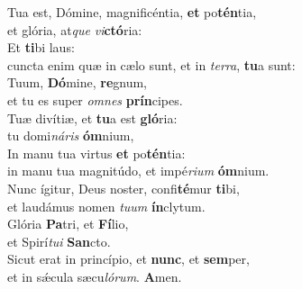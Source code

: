 \evenverse Tua est, Dómine, magnificéntia, \textbf{et} po\textbf{tén}tia,~\*\\
\evenverse et glória, at\textit{que} \textit{vi}\textbf{ctó}ria:\\
\oddverse Et \textbf{ti}bi laus:~\*\\
\oddverse cuncta enim quæ in cælo sunt, et in \textit{ter}\textit{ra}, \textbf{tu}a sunt:\\
\evenverse Tuum, \textbf{Dó}mine, \textbf{re}gnum,~\*\\
\evenverse et tu es super \textit{om}\textit{nes} \textbf{prín}cipes.\\
\oddverse Tuæ divítiæ, et \textbf{tu}a est \textbf{gló}ria:~\*\\
\oddverse tu domi\textit{ná}\textit{ris} \textbf{óm}nium,\\
\evenverse In manu tua virtus \textbf{et} po\textbf{tén}tia:~\*\\
\evenverse in manu tua magnitúdo, et impé\textit{ri}\textit{um} \textbf{óm}nium.\\
\oddverse Nunc ígitur, Deus noster, confi\textbf{té}mur \textbf{ti}bi,~\*\\
\oddverse et laudámus nomen \textit{tu}\textit{um} \textbf{ín}clytum.\\
\evenverse Glória \textbf{Pa}tri, et \textbf{Fí}lio,~\*\\
\evenverse et Spirí\textit{tu}\textit{i} \textbf{San}cto.\\
\oddverse Sicut erat in princípio, et \textbf{nunc}, et \textbf{sem}per,~\*\\
\oddverse et in sǽcula sæcu\textit{ló}\textit{rum}. \textbf{A}men.\\
